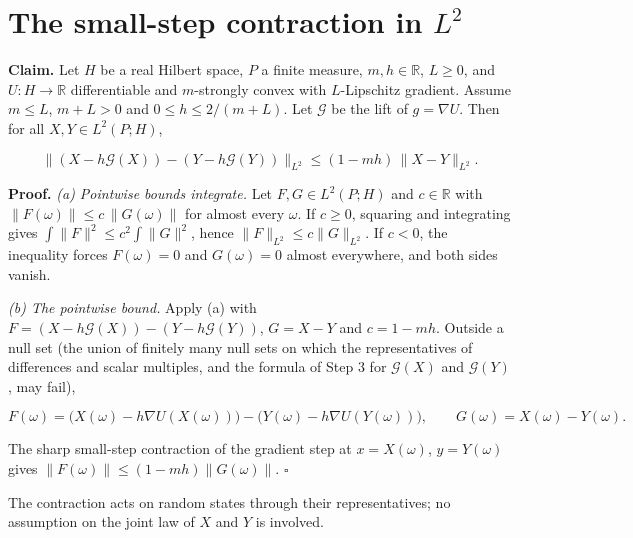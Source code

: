 \documentclass[11pt,a4paper]{article}
\begin{document}
\section{\texorpdfstring{The small-step contraction in \(L^2\)}{The small-step contraction in L²}}


\textbf{Claim.} Let \(H\) be a real Hilbert space, \(P\) a finite measure, \(m,h\in\mathbb R\), \(L\ge0\), and \(U:H\to\mathbb R\) differentiable and \(m\)-strongly convex with \(L\)-Lipschitz gradient. Assume \(m\le L\), \(m+L>0\) and \(0\le h\le2/(m+L)\). Let \(\mathcal G\) be the lift of \(g=\nabla U\). Then for all \(X,Y\in L^2(P;H)\),


\[\bigl\|(X-h\mathcal G(X))-(Y-h\mathcal G(Y))\bigr\|_{L^2}\le(1-mh)\,\|X-Y\|_{L^2}.\]


\textbf{Proof.} \emph{(a) Pointwise bounds integrate.} Let \(F,G\in L^2(P;H)\) and \(c\in\mathbb R\) with \(\|F(\omega)\|\le c\,\|G(\omega)\|\) for almost every \(\omega\). If \(c\ge0\), squaring and integrating gives \(\int\|F\|^2\le c^2\int\|G\|^2\), hence \(\|F\|_{L^2}\le c\|G\|_{L^2}\). If \(c<0\), the inequality forces \(F(\omega)=0\) and \(G(\omega)=0\) almost everywhere, and both sides vanish.




\emph{(b) The pointwise bound.} Apply (a) with \(F=(X-h\mathcal G(X))-(Y-h\mathcal G(Y))\), \(G=X-Y\) and \(c=1-mh\). Outside a null set (the union of finitely many null sets on which the representatives of differences and scalar multiples, and the formula of Step 3 for \(\mathcal G(X)\) and \(\mathcal G(Y)\), may fail),


\[F(\omega)=\bigl(X(\omega)-h\nabla U(X(\omega))\bigr)-\bigl(Y(\omega)-h\nabla U(Y(\omega))\bigr),\qquad G(\omega)=X(\omega)-Y(\omega).\]


The sharp small-step contraction of the gradient step at \(x=X(\omega)\), \(y=Y(\omega)\) gives \(\|F(\omega)\|\le(1-mh)\|G(\omega)\|\). \(\square\)




The contraction acts on random states through their representatives; no assumption on the joint law of \(X\) and \(Y\) is involved.
\end{document}
